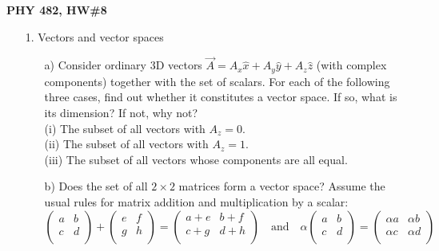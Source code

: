 \documentclass[11pt]{article}
\begin{document}
\thispagestyle{empty}

\centerline{\bf PHY 482, HW\#8}

\begin{itemize}
%
\item[1.] Vectors and vector spaces
\begin{itemize}
\item[a)] 
    Consider ordinary 3D vectors $\vec{A} = A_x \hat{x} + A_y \hat{y} + A_z \hat{z}$ (with complex components) together with the set of scalars.  For each of the following three cases, find out whether it constitutes a vector space.  If so, what is its dimension?  If not, why not?
    \\ 
    (i) The subset of all vectors with $A_z = 0$.
    \\
    (ii) The subset of all vectors with $A_z = 1$.
    \\
    (iii) The subset of all vectors whose components are all equal.
\item[b)]
    Does the set of all $2 \times 2$ matrices form a vector space? Assume the usual rules for matrix addition and multiplication by a scalar:
    \begin{displaymath}
    \left( \begin{array}{cc}
        a   &   b\\
        c   &   d\\
    \end{array} \right)
    +
    \left( \begin{array}{cc}
        e   &   f\\
        g   &   h\\
    \end{array} \right)
    =
    \left( \begin{array}{cc}
        a+e   &   b+f\\
        c+g   &   d+h\\
    \end{array} \right)
    \quad
    \text{and}
    \quad
    \alpha
    \left( \begin{array}{cc}
        a   &   b\\
        c   &   d\\
    \end{array} \right)
    =
    \left( \begin{array}{cc}
        \alpha a   &   \alpha b\\
        \alpha c   &   \alpha d\\
    \end{array} \right)
    \end{displaymath}

\end{itemize}
\end{itemize}
\end{document}

